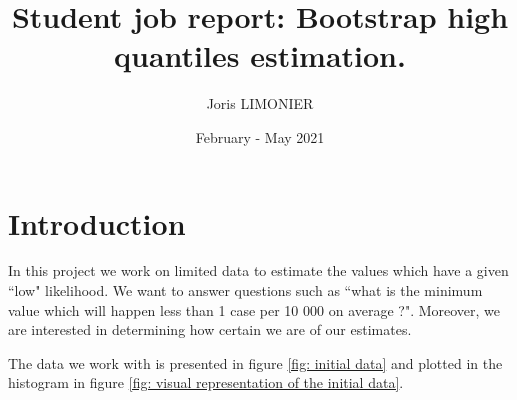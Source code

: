 \documentclass{article}
\title{Student job report: Bootstrap high quantiles estimation.}
\author{Joris LIMONIER}
\date{February - May 2021}
\begin{document}
\maketitle

\tableofcontents
\newpage

\section{Introduction}
In this project we work on limited data to estimate the values which have a given ``low" likelihood. We want to answer questions such as ``what is the minimum value which will happen less than 1 case per 10 000 on average ?". Moreover, we are interested in determining how certain we are of our estimates.

The data we work with is presented in figure \ref{fig: initial data} and plotted in the histogram in figure \ref{fig: visual representation of the initial data}.
\end{document}
